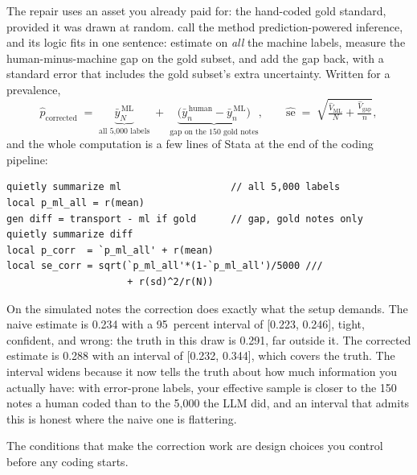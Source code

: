 \documentclass[
    a4paper,
    fontsize=10pt,
    twoside=true,
    numbers=noenddot,
]{kaobook}
\begin{document}
The repair uses an asset you already paid for: the hand-coded gold standard, provided it was drawn at random. \textcite{angelopoulos2023ppi} call the method prediction-powered inference, and its logic fits in one sentence: estimate on \emph{all} the machine labels, measure the human-minus-machine gap on the gold subset, and add the gap back, with a standard error that includes the gold subset's extra uncertainty. Written for a prevalence,
\[
\hat{p}_{\text{corrected}}
\;=\;
\underbrace{\bar{y}^{\,\text{ML}}_{N}}_{\text{all 5{,}000 labels}}
\;+\;
\underbrace{\bigl(\bar{y}^{\,\text{human}}_{n} - \bar{y}^{\,\text{ML}}_{n}\bigr)}_{\text{gap on the 150 gold notes}},
\qquad
\widehat{\text{se}}
\;=\;
\sqrt{\tfrac{\widehat{V}_{\text{ML}}}{N} + \tfrac{\widehat{V}_{\text{gap}}}{n}},
\]
and the whole computation is a few lines of Stata at the end of the coding pipeline:
\par
{\footnotesize
\begin{verbatim}
quietly summarize ml                   // all 5,000 labels
local p_ml_all = r(mean)
gen diff = transport - ml if gold      // gap, gold notes only
quietly summarize diff
local p_corr  = `p_ml_all' + r(mean)
local se_corr = sqrt(`p_ml_all'*(1-`p_ml_all')/5000 ///
                     + r(sd)^2/r(N))
\end{verbatim}
}
On the simulated notes the correction does exactly what the setup demands. The naive estimate is 0.234 with a 95~percent interval of [0.223, 0.246], tight, confident, and wrong: the truth in this draw is 0.291, far outside it. The corrected estimate is 0.288 with an interval of [0.232, 0.344], which covers the truth. The interval widens because it now tells the truth about how much information you actually have: with error-prone labels, your effective sample is closer to the 150 notes a human coded than to the 5{,}000 the LLM did, and an interval that admits this is honest where the naive one is flattering.

The conditions that make the correction work are design choices you control before any coding starts.
\end{document}
